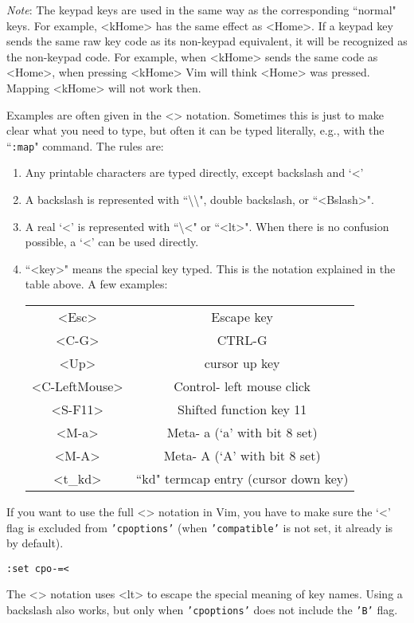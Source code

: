 \begin{description}
\textit{Note}: The keypad keys are used in the same way as the corresponding ``normal" keys.
For example, <kHome> has the same effect as <Home>.
If a keypad key sends the same raw key code as its non-keypad equivalent, it will be recognized as the non-keypad code.
For example, when <kHome> sends the same code as <Home>, when pressing <kHome> Vim will think <Home> was pressed.
Mapping <kHome> will not work then.

\label{<>}
Examples are often given in the <> notation.
Sometimes this is just to make clear what you need to type, but often it can be typed literally, e.g., with the ``\texttt{:map}" command.
The rules are:
\begin{enumerate}
				\item Any printable characters are typed directly, except backslash and `<'
				\item A backslash is represented with ``\textbackslash\textbackslash", double backslash, or ``<Bslash>".
				\item A real `<' is represented with ``\textbackslash<" or ``<lt>".  When there is no
								confusion possible, a `<' can be used directly.
				\item ``<key>" means the special key typed.  This is the notation explained in
								the table above.  A few examples:
								\begin{center}
												\begin{tabular}{c c}
																<Esc> & Escape key\\
																<C-G> & CTRL-G\\
																<Up> & cursor up key\\
																<C-LeftMouse> & Control- left mouse click\\
																<S-F11> & Shifted function key 11\\
																<M-a> & Meta- a  (`a' with bit 8 set)\\
																<M-A> & Meta- A  (`A' with bit 8 set)\\
																<t\_kd> & ``kd" termcap entry (cursor down key)\\
												\end{tabular}
								\end{center}
\end{enumerate}
\end{description}

If you want to use the full <> notation in Vim, you have to make sure the `<' flag is excluded from \texttt{'cpoptions'} (when \texttt{'compatible'} is not set, it already is by default).
\begin{Verbatim}[samepage=true]
 :set cpo-=<
\end{Verbatim}
The <> notation uses <lt> to escape the special meaning of key names.
Using a backslash also works, but only when \texttt{'cpoptions'} does not include the \texttt{'B'} flag.

